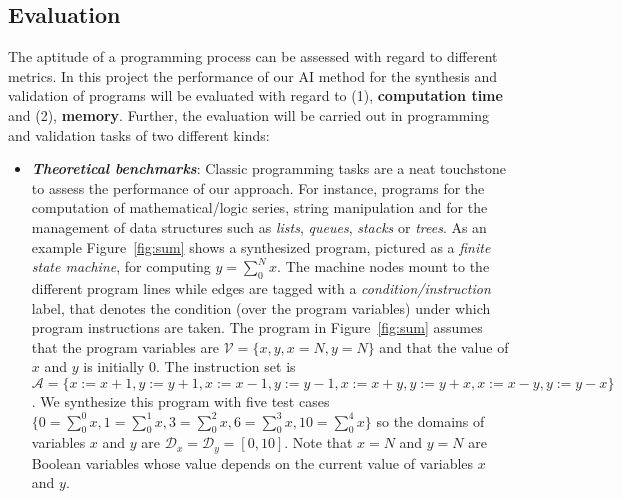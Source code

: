 \documentclass[10pt,a4paper]{paper}
\begin{document}
\subsection{Evaluation}
\label{sec:evaluation}
The aptitude of a programming process can be assessed with regard to different metrics. In this project the performance of our AI method for the synthesis and validation of programs will be evaluated with regard to (1), {\bf computation time} and (2), {\bf memory}. Further, the evaluation will be carried out in programming and validation tasks of two different kinds:
\begin{itemize}
\item {\bf\em Theoretical benchmarks}: Classic programming tasks are a neat touchstone to assess the performance of our approach. For instance, programs for the computation of mathematical/logic series, string manipulation and for the management of data structures such as {\em lists}, {\em queues}, {\em stacks} or {\em trees}. As an example Figure~\ref{fig:sum} shows a synthesized program, pictured as a {\em finite state machine}, for computing $y = \sum_0^N x$. The machine nodes mount to the different program lines while edges are tagged with a {\em condition/instruction} label, that denotes the condition (over the program variables) under which program instructions are taken.  The program in Figure~\ref{fig:sum} assumes that the program variables are ${\mathcal V}=\{x,y,x=N,y=N\}$ and that the value of $x$ and $y$ is initially 0. The instruction set is ${\mathcal A}=\{x:=x+1, y:=y+1, x:=x-1, y:=y-1, x:=x+y, y:=y+x, x:=x-y, y:=y-x\}$. We synthesize this program with five test cases $\{0=\sum_0^0 x, 1=\sum_0^1 x, 3=\sum_0^2 x, 6=\sum_0^3 x, 10=\sum_0^4 x\}$ so the domains of variables $x$ and $y$ are ${\mathcal D}_x = {\mathcal D}_y = [0,10]$. Note that $x=N$ and $y=N$ are Boolean variables whose value depends on the current value of variables $x$ and $y$.


\end{itemize}
\end{document}
